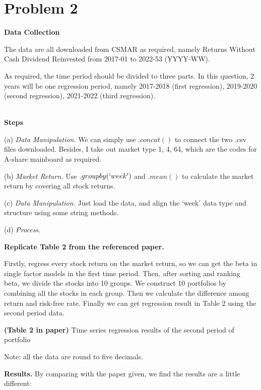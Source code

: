 
\section*{Problem 2}

\noindent
\textbf{Data Collection}

The data are all downloaded from CSMAR as required, namely Returns Without Cash Dividend Reinvested from 2017-01 to 2022-53 (YYYY-WW).

As required, the time period should be divided to three parts. In this question, 2 years will be one regression period, namely 2017-2018 (first regression), 2019-2020 (second regression), 2021-2022 (third regression).

\\

\noindent
\textbf{Steps}

(a) \textit{Data Manipulation.} We can simply use $.concat()$ to connect the two .csv files downloaded. Besides, I take out market type 1, 4, 64, which are the codes for A-share mainboard as required.

(b) \textit{Market Return.} Use $.groupby(`week')$ and $.mean()$ to calculate the market return by covering all stock returns.

(c) \textit{Data Manipulation.} Just load the data, and align the `week' data type and structure using some string methods.

(d) \textit{Process.} 

\noindent
\textbf{Replicate Table 2 from the referenced paper.}

Firstly, regress every stock return on the market return, so we can get the beta in single factor models in the first time period. Then, after sorting and ranking beta, we divide the stocks into 10 groups. We construct 10 portfolios by combining all the stocks in each group. Then we calculate the difference among return and risk-free rate. Finally we can get regression result in Table 2 using the second period data.

\begin{table}[htbp]
    \centering
    \caption{\textbf{(Table 2 in paper)} Time series regression results of the second period of portfolio}
    \vspace{0.4cm}
\end{table}

Note: all the data are round to five decimals.

\noindent
\textbf{Results.} By comparing with the paper given, we find the results are a little different:

